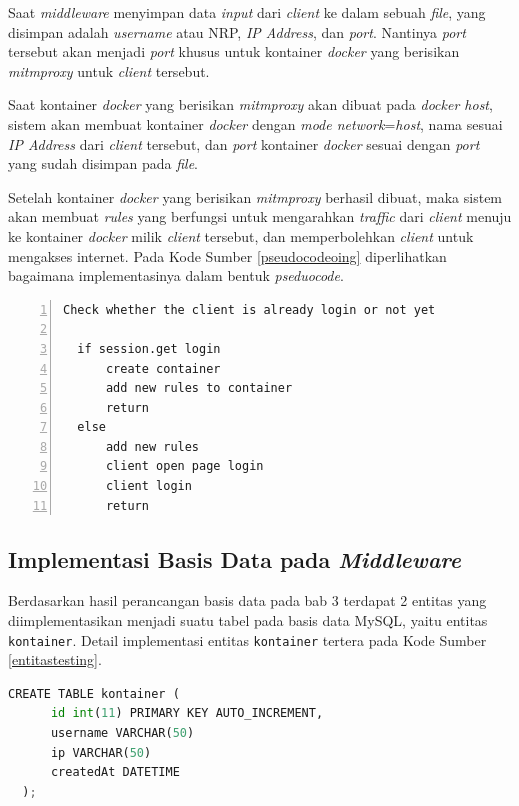   Saat \textit{middleware} menyimpan data \textit{input} dari \textit{client} ke dalam sebuah \textit{file}, yang disimpan adalah \textit{username} atau NRP, \textit{IP Address}, dan \textit{port}. Nantinya \textit{port} tersebut akan menjadi \textit{port} khusus untuk kontainer \textit{docker} yang berisikan \textit{mitmproxy} untuk \textit{client} tersebut.
  
  Saat kontainer \textit{docker} yang berisikan \textit{mitmproxy} akan dibuat pada \textit{docker host}, sistem akan membuat kontainer \textit{docker} dengan \textit{mode network}=\textit{host}, nama sesuai \textit{IP Address} dari \textit{client} tersebut, dan \textit{port} kontainer \textit{docker} sesuai dengan \textit{port} yang sudah disimpan pada \textit{file}.
  
  Setelah kontainer \textit{docker} yang berisikan \textit{mitmproxy} berhasil dibuat, maka sistem akan membuat \textit{rules} yang berfungsi untuk mengarahkan \textit{traffic} dari \textit{client} menuju ke kontainer \textit{docker} milik \textit{client} tersebut, dan memperbolehkan \textit{client} untuk mengakses internet. Pada Kode Sumber \ref{pseudocodeoing} diperlihatkan bagaimana implementasinya dalam bentuk \textit{pseduocode}.
  \newline
  \begin{minipage}{\linewidth}  
  \begin{lstlisting}[numbers=left, frame=single,tabsize=2,breaklines,caption={Pseudocode Web Service},label=pseudocodeoing]
  Check whether the client is already login or not yet
  	
  if session.get login
	  create container
	  add new rules to container
	  return
  else
	  add new rules
	  client open page login
	  client login
	  return  	
  \end{lstlisting}
  \end{minipage}
  
  \subsection{Implementasi Basis Data pada \textit{Middleware}}
  Berdasarkan hasil perancangan basis data pada bab 3 terdapat 2 entitas yang diimplementasikan menjadi suatu tabel pada basis data MySQL, yaitu entitas \texttt{kontainer}. Detail implementasi entitas \texttt{kontainer} tertera pada Kode Sumber \ref{entitastesting}.
  \newline
  \begin{minipage}{\linewidth}
  \begin{lstlisting}[language=python, caption=\textit{Query} untuk membuat tabel testing,label=entitastesting]
  CREATE TABLE kontainer (
	  id int(11) PRIMARY KEY AUTO_INCREMENT,
	  username VARCHAR(50)
	  ip VARCHAR(50)
	  createdAt DATETIME
  );
  \end{lstlisting}
  \end{minipage}
    
